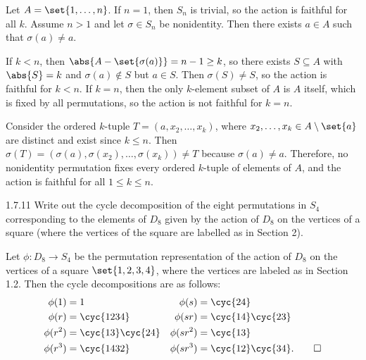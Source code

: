 \begin{sol}
    Let $A = \set{1, \ldots, n}$.
    If $n = 1$, then $S_n$ is trivial, so the action is faithful for all $k$.
    Assume $n > 1$ and let $\sigma \in S_n$ be nonidentity.
    Then there exists $a \in A$ such that $\sigma(a) \neq a$.
    \begin{subexercises}
        \item If $k < n$, then $\abs{A - \set{\sigma(a)}} = n - 1 \geq k$, so there exists $S \subseteq A$ with $\abs{S} = k$ and $\sigma(a) \notin S$ but $a \in S$.
        Then $\sigma(S) \neq S$, so the action is faithful for $k < n$.
        If $k = n$, then the only $k$-element subset of $A$ is $A$ itself, which is fixed by all permutations, so the action is not faithful for $k = n$.
        
        \item Consider the ordered $k$-tuple $T = (a, x_2, \ldots, x_k)$, where $x_2, \ldots, x_k \in A \setminus \set{a}$ are distinct and exist since $k \leq n$.
        Then $\sigma(T) = (\sigma(a), \sigma(x_2), \ldots, \sigma(x_k)) \neq T$ because $\sigma(a) \neq a$.
        Therefore, no nonidentity permutation fixes every ordered $k$-tuple of elements of $A$, and the action is faithful for all $1 \leq k \leq n$. \qedhere
    \end{subexercises}
\end{sol}

\begin{exercise}{1.7.11}
    Write out the cycle decomposition of the eight permutations in $S_4$ corresponding to the elements of $D_8$ given by the action of $D_8$ on the vertices of a square (where the vertices of the square are labelled as in Section 2).
\end{exercise}

\begin{sol}
    Let $\phi \colon D_8 \to S_4$ be the permutation representation of the action of $D_8$ on the vertices of a square $\set{1, 2, 3, 4}$, where the vertices are labeled as in Section 1.2.
	Then the cycle decompositions are as follows:
    \begin{align*}
        \phi(1) & = 1 & \phi(s) & = \cyc{2 4} \\
        \phi(r) & = \cyc{1 2 3 4} & \phi(sr) & = \cyc{1 4}\cyc{2 3} \\
        \phi(r^2) & = \cyc{1 3}\cyc{2 4} & \phi(sr^2) & = \cyc{1 3} \\
        \phi(r^3) & = \cyc{1 4 3 2} & \phi(sr^3) & = \cyc{1 2}\cyc{3 4}. \qedhere
    \end{align*}
\end{sol}

